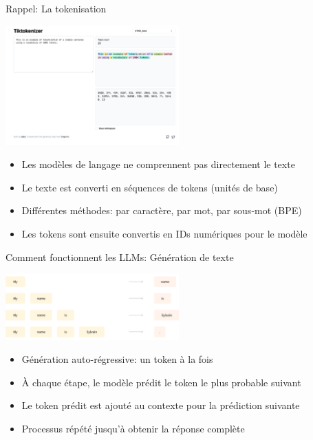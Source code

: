 \documentclass[aspectratio=169]{beamer}
\begin{document}
\begin{frame}{Rappel: La tokenisation}
    \begin{center}
        \includegraphics[width=0.5\textwidth]{images/tiktoken.png}
    \end{center}
    \begin{itemize}
        \item Les modèles de langage ne comprennent pas directement le texte
        \item Le texte est converti en séquences de tokens (unités de base)
        \item Différentes méthodes: par caractère, par mot, par sous-mot (BPE)
        \item Les tokens sont ensuite convertis en IDs numériques pour le modèle
    \end{itemize}
\end{frame}

\begin{frame}{Comment fonctionnent les LLMs: Génération de texte}
    \begin{center}
        \includegraphics[width=0.5\textwidth]{images/causal_modeling.png} 
    \end{center}
    \begin{itemize}
        \item Génération auto-régressive: un token à la fois
        \item À chaque étape, le modèle prédit le token le plus probable suivant
        \item Le token prédit est ajouté au contexte pour la prédiction suivante
        \item Processus répété jusqu'à obtenir la réponse complète
    \end{itemize}
\end{frame}
\end{document}
